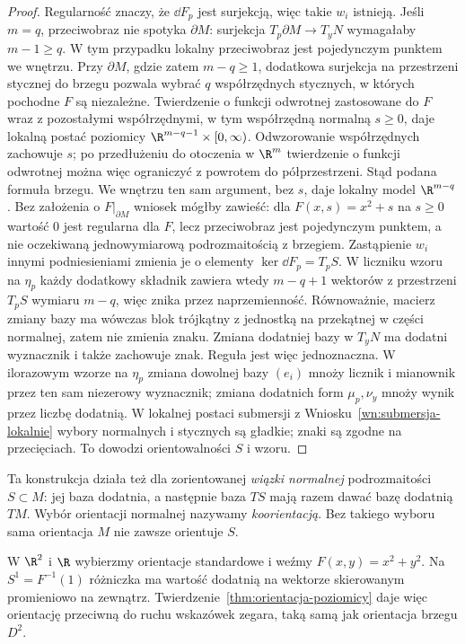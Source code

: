 \begin{proof}
Regularność znaczy, że $\dd F_p$ jest surjekcją,
więc takie $w_i$ istnieją. Jeśli $m=q$, przeciwobraz
nie spotyka $\partial M$: surjekcja
$T_p\partial M\to T_yN$ wymagałaby $m-1\geq q$.
W tym przypadku lokalny przeciwobraz jest pojedynczym
punktem we wnętrzu. Przy $\partial M$, gdzie zatem
$m-q\geq1$, dodatkowa
surjekcja na przestrzeni stycznej do brzegu pozwala wybrać
$q$ współrzędnych stycznych, w których pochodne $F$ są
niezależne. Twierdzenie o funkcji odwrotnej zastosowane
do $F$ wraz z pozostałymi współrzędnymi, w tym współrzędną
normalną $s\geq0$, daje lokalną postać poziomicy
$\R^{m-q-1}\times[0,\infty)$.
Odwzorowanie współrzędnych zachowuje $s$; po przedłużeniu
do otoczenia w $\R^m$ twierdzenie o funkcji odwrotnej
można więc ograniczyć z powrotem do półprzestrzeni.
Stąd podana formuła brzegu. We wnętrzu ten sam argument,
bez $s$, daje lokalny model $\R^{m-q}$.
Bez założenia o $F|_{\partial M}$ wniosek mógłby zawieść:
dla $F(x,s)=x^2+s$ na $s\geq0$ wartość $0$ jest regularna
dla $F$, lecz przeciwobraz jest pojedynczym punktem,
a nie oczekiwaną jednowymiarową podrozmaitością z brzegiem.
Zastąpienie $w_i$ innymi podniesieniami zmienia je o elementy
$\ker\dd F_p=T_pS$. W liczniku wzoru na $\eta_p$
każdy dodatkowy składnik zawiera wtedy $m-q+1$
wektorów z przestrzeni $T_pS$ wymiaru $m-q$,
więc znika przez naprzemienność. Równoważnie,
macierz zmiany bazy ma wówczas
blok trójkątny z jednostką na przekątnej w części
normalnej, zatem nie zmienia znaku. Zmiana
dodatniej bazy w $T_yN$ ma dodatni wyznacznik
i także zachowuje znak. Reguła jest więc
jednoznaczna. W ilorazowym wzorze na $\eta_p$ zmiana
dowolnej bazy $(e_i)$ mnoży licznik i mianownik przez
ten sam niezerowy wyznacznik; zmiana dodatnich form
$\mu_p,\nu_y$ mnoży wynik przez liczbę dodatnią.
W lokalnej postaci submersji z
Wniosku~\ref{wn:submersja-lokalnie} wybory normalnych
i stycznych są gładkie; znaki są zgodne na przecięciach.
To dowodzi orientowalności $S$ i wzoru.
\end{proof}

Ta konstrukcja działa też dla zorientowanej
\emph{wiązki normalnej} podrozmaitości $S\subset M$:
jej baza dodatnia, a następnie baza $TS$ mają razem
dawać bazę dodatnią $TM$. Wybór orientacji normalnej
nazywamy \emph{koorientacją}. Bez takiego wyboru sama
orientacja $M$ nie zawsze orientuje $S$.

\begin{przyklad}
W $\R^2$ i $\R$ wybierzmy orientacje standardowe
i weźmy $F(x,y)=x^2+y^2$. Na $S^1=F^{-1}(1)$
różniczka ma wartość dodatnią na wektorze
skierowanym promieniowo na zewnątrz.
Twierdzenie~\ref{thm:orientacja-poziomicy} daje więc
orientację przeciwną do ruchu wskazówek zegara,
taką samą jak orientacja brzegu $D^2$.
\end{przyklad}

